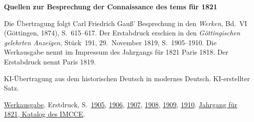 \clearpage\thispagestyle{empty}
\begin{center}\Large\bfseries Quellen zur Besprechung der Connaissance des tems für 1821\end{center}

Die Übertragung folgt Carl Friedrich Gauß’ Besprechung in den \emph{Werken}, Bd.~VI (Göttingen, 1874), S.~615--617. Der Erstabdruck erschien in den \emph{Göttingischen gelehrten Anzeigen}, Stück~191, 29.~November 1819, S.~1905--1910. Die Werkausgabe nennt im Impressum des Jahrgangs für 1821 Paris 1818. Der Erstabdruck nennt Paris 1819.

KI-Übertragung aus dem historischen Deutsch in modernes Deutsch. KI-erstellter Satz.

\href{https://gdz.sub.uni-goettingen.de/id/PPN236007467}{Werkausgabe}. Erstdruck, S.~\href{https://images.p.sub.uni-goettingen.de/iiif/image/gdz:PPN319721507_1819:00001919/full/1650,/0/default.jpg}{1905}, \href{https://images.p.sub.uni-goettingen.de/iiif/image/gdz:PPN319721507_1819:00001920/full/1650,/0/default.jpg}{1906}, \href{https://images.p.sub.uni-goettingen.de/iiif/image/gdz:PPN319721507_1819:00001921/full/1650,/0/default.jpg}{1907}, \href{https://images.p.sub.uni-goettingen.de/iiif/image/gdz:PPN319721507_1819:00001922/full/1650,/0/default.jpg}{1908}, \href{https://images.p.sub.uni-goettingen.de/iiif/image/gdz:PPN319721507_1819:00001923/full/1650,/0/default.jpg}{1909}, \href{https://images.p.sub.uni-goettingen.de/iiif/image/gdz:PPN319721507_1819:00001924/full/1650,/0/default.jpg}{1910}. \href{https://cdt.imcce.fr/items/show/170}{Jahrgang für 1821, Katalog des IMCCE}.

\clearpage

